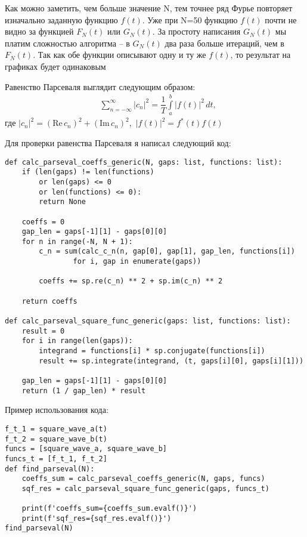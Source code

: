 \documentclass[a4paper, 16pt]{article}
\begin{document}
\noindent Как можно заметить, чем больше значение N, тем точнее
ряд Фурье повторяет изначально заданную функцию $f(t)$. Уже при N=50
функцию $f(t)$ почти не видно за функцией $F_N(t)$ или $G_N(t)$. За простоту написания
$G_N(t)$ мы платим сложностью алгоритма -- в $G_N(t)$ два раза больше итераций, чем в $F_N(t)$.
Так как обе функции описывают одну и ту же $f(t)$, то результат на графиках будет одинаковым


\newpage
\noindent Равенство Парсеваля выглядит следующим образом:
\begin{align*}
    & \sum_{n=-\infty}^{\infty}|c_n|^2=\dfrac{1}{T}\int\limits_{a}^{b}|f(t)|^2\,dt,
\end{align*}
\noindent где $|c_n|^2=(\text{Re}\,c_n)^2+(\text{Im}\,c_n)^2,\,\,|f(t)|^2=f^{*}(t)f(t)$

\noindent Для проверки равенства Парсеваля я написал следующий код:
\begin{lstlisting}
def calc_parseval_coeffs_generic(N, gaps: list, functions: list):
    if (len(gaps) != len(functions) 
        or len(gaps) <= 0 
        or len(functions) <= 0):
        return None
        
    coeffs = 0
    gap_len = gaps[-1][1] - gaps[0][0]
    for n in range(-N, N + 1):
        c_n = sum(calc_c_n(n, gap[0], gap[1], gap_len, functions[i]) 
                for i, gap in enumerate(gaps))
            
        coeffs += sp.re(c_n) ** 2 + sp.im(c_n) ** 2

    return coeffs

def calc_parseval_square_func_generic(gaps: list, functions: list):
    result = 0
    for i in range(len(gaps)):
        integrand = functions[i] * sp.conjugate(functions[i])
        result += sp.integrate(integrand, (t, gaps[i][0], gaps[i][1]))
        
    gap_len = gaps[-1][1] - gaps[0][0]
    return (1 / gap_len) * result
\end{lstlisting}


\noindent Пример использования кода:
\begin{lstlisting}
f_t_1 = square_wave_a(t)
f_t_2 = square_wave_b(t)
funcs = [square_wave_a, square_wave_b]
funcs_t = [f_t_1, f_t_2]
def find_parseval(N):
    coeffs_sum = calc_parseval_coeffs_generic(N, gaps, funcs)
    sqf_res = calc_parseval_square_func_generic(gaps, funcs_t)

    print(f'coeffs_sum={coeffs_sum.evalf()}')
    print(f'sqf_res={sqf_res.evalf()}')
find_parseval(N)
\end{lstlisting}
\end{document}
